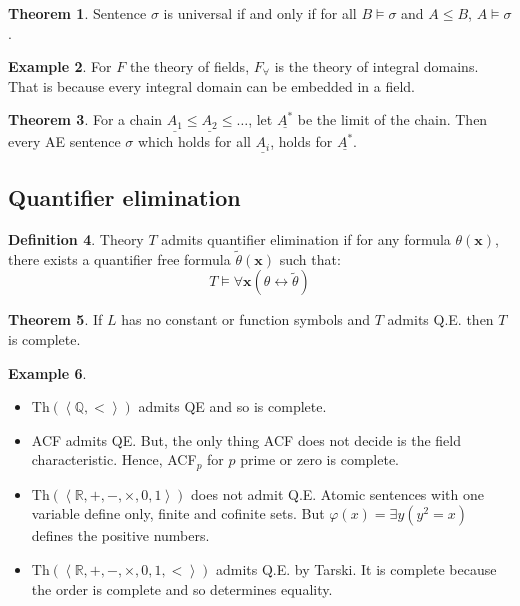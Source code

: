 \documentclass[a4paper,10pt]{article}
\theoremstyle{definition}
\newtheorem{theorem}{Theorem}
\newtheorem{definition}[theorem]{Definition}
\newtheorem{example}[theorem]{Example}
\let\vec\mathbf
\begin{document}
\begin{theorem}
    Sentence $\sigma$ is universal if and only if for all $B \models \sigma$ and $A \leqslant B$, $A \models \sigma$.
\end{theorem}

\begin{example}
    For $F$ the theory of fields, $F_\forall$ is the theory of integral domains.
    That is because every integral domain can be embedded in a field.
\end{example}

\begin{theorem}
    For a chain $\underline{A_1} \leqslant \underline{A_2} \leqslant \ldots$, let $\underline{A^*}$ be the limit of the chain. Then every AE sentence $\sigma$ which holds for all $\underline{A_i}$, holds for $\underline{A^*}$.
\end{theorem}

\subsection*{Quantifier elimination}

\begin{definition}
    Theory $T$ admits quantifier elimination if for any formula $\theta(\vec{x})$, there exists a quantifier free formula $\tilde{\theta}(\vec{x})$ such that:
    \[
        T \models \forall \vec{x} (\theta \leftrightarrow \tilde{\theta})
    \]
\end{definition}

\begin{theorem}
    If $L$ has no constant or function symbols and $T$ admits Q.E. then $T$ is complete.
\end{theorem}

\begin{example}
    \begin{itemize}
        \item Th$(\left\langle \mathbb{Q}, < \right\rangle )$ admits QE and so is complete.
        \item ACF admits QE. But, the only thing ACF does not decide is the field characteristic. Hence, ACF$_p$ for $p$ prime or zero is complete.
        \item Th$(\left\langle \mathbb{R}, +, -, \times, 0, 1\right\rangle )$ does not admit Q.E. Atomic sentences with one variable define only, finite and cofinite sets. But $\varphi(x) = \exists y (y^2 = x)$ defines the positive numbers.
        \item Th$(\left\langle \mathbb{R}, +, -, \times, 0, 1, < \right\rangle )$ admits Q.E. by Tarski. It is complete because the order is complete and so determines equality.
    \end{itemize}
\end{example}
\end{document}
